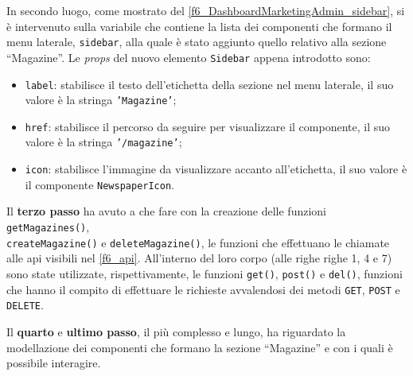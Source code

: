 
In secondo luogo, come mostrato del \autoref{f6_DashboardMarketingAdmin_sidebar}, si è intervenuto sulla variabile che contiene la lista dei componenti che formano il menu laterale, \texttt{sidebar}, alla quale è stato aggiunto quello relativo alla sezione “Magazine”. Le \textit{props} del nuovo elemento \texttt{Sidebar} appena introdotto sono:
\begin{itemize}
    \item \texttt{label}: stabilisce il testo dell'etichetta della sezione nel menu laterale, il suo valore è la stringa \texttt{'Magazine'};
    
    \item \texttt{href}: stabilisce il percorso da seguire per visualizzare il componente, il suo valore è la stringa \texttt{'/magazine'};
    
    \item \texttt{icon}: stabilisce l'immagine da visualizzare accanto all'etichetta, il suo valore è il componente \texttt{NewspaperIcon}.
    
\end{itemize}



Il \textbf{terzo passo} ha avuto a che fare con la creazione delle funzioni \texttt{getMagazines()}, \\\texttt{createMagazine()} e \texttt{deleteMagazine()}, le funzioni che effettuano le chiamate alle \gls{api} visibili nel \autoref{f6_api}. All'interno del loro corpo (alle righe righe 1, 4 e 7) sono state utilizzate, rispettivamente, le funzioni \texttt{get()}, \texttt{post()} e \texttt{del()}, funzioni che hanno il compito di effettuare le richieste avvalendosi dei metodi \texttt{GET}, \texttt{POST} e \texttt{DELETE}.



Il \textbf{quarto} e \textbf{ultimo passo}, il più complesso e lungo, ha riguardato la modellazione dei componenti che formano la sezione “Magazine” e con i quali è possibile interagire.

